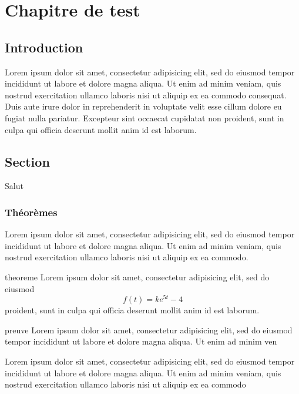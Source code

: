 \chapter{Chapitre de test}

\section{Introduction}
	Lorem ipsum dolor sit amet, consectetur adipisicing elit, sed do eiusmod
	tempor incididunt ut labore et dolore magna aliqua. Ut enim ad minim veniam,
	quis nostrud exercitation ullamco laboris nisi ut aliquip ex ea commodo
	consequat. Duis aute irure dolor in reprehenderit in voluptate velit esse
	cillum dolore eu fugiat nulla pariatur. Excepteur sint occaecat cupidatat non
	proident, sunt in culpa qui officia deserunt mollit anim id est laborum.


\section{Section}
	
		Salut 

	\subsection{Théorèmes}
		
		Lorem ipsum dolor sit amet, consectetur adipisicing elit, sed do eiusmod
		tempor incididunt ut labore et dolore magna aliqua. Ut enim ad minim veniam,
		quis nostrud exercitation ullamco laboris nisi ut aliquip ex ea commodo.

		\begin{theoreme}
			theoreme
			Lorem ipsum dolor sit amet, consectetur adipisicing elit, sed do eiusmod
			$$
				f(t) = ke^{5t} - 4
			$$
			proident, sunt in culpa qui officia deserunt mollit anim id est laborum.
		\end{theoreme}

		\begin{preuve}
			preuve
			Lorem ipsum dolor sit amet, consectetur adipisicing elit, sed do eiusmod
			tempor incididunt ut labore et dolore magna aliqua. Ut enim ad minim ven		
		\end{preuve}

		\begin{ex}
			Lorem ipsum dolor sit amet, consectetur adipisicing elit, sed do eiusmod
			tempor incididunt ut labore et dolore magna aliqua. Ut enim ad minim veniam,
			quis nostrud exercitation ullamco laboris nisi ut aliquip ex ea commodo
		\end{ex}

